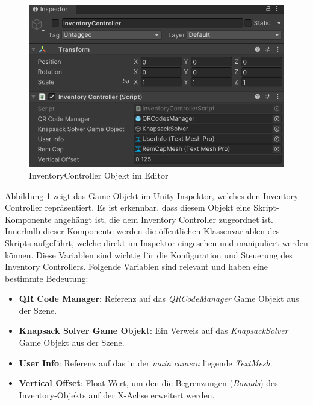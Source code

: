 \begin{figure}[H]
    \centering
    \includegraphics[scale=0.7]{images/invCon_Editor}
    \caption{InventoryController Objekt im Editor}
    \label{fig:InventoryController_Editor}
\end{figure}

Abbildung \ref{fig:InventoryController_Editor} zeigt das Game Objekt im Unity Inspektor, welches den Inventory Controller
repräsentiert. Es ist erkennbar, dass diesem Objekt eine Skript-Komponente angehängt ist, die dem Inventory Controller
zugeordnet ist. Innerhalb dieser Komponente werden die öffentlichen Klassenvariablen des Skripts aufgeführt, welche direkt
im Inspektor eingesehen und manipuliert werden können. Diese Variablen sind wichtig für die Konfiguration und Steuerung
des Inventory Controllers. Folgende Variablen sind relevant und haben eine bestimmte Bedeutung:

\begin{itemize}
    \item \textbf{QR Code Manager}: Referenz auf das \textit{QRCodeManager} Game Objekt aus der Szene.

    \item \textbf{Knapsack Solver Game Objekt}: Ein Verweis auf das \textit{KnapsackSolver} Game Objekt aus der Szene.

    \item \textbf{User Info}: Referenz auf das in der \textit{main camera} liegende \textit{TextMesh}.

    \item \textbf{Vertical Offset}: Float-Wert, um den die Begrenzungen (\textit{Bounds}) des Inventory-Objekts auf
    der X-Achse erweitert werden.
\end{itemize}


